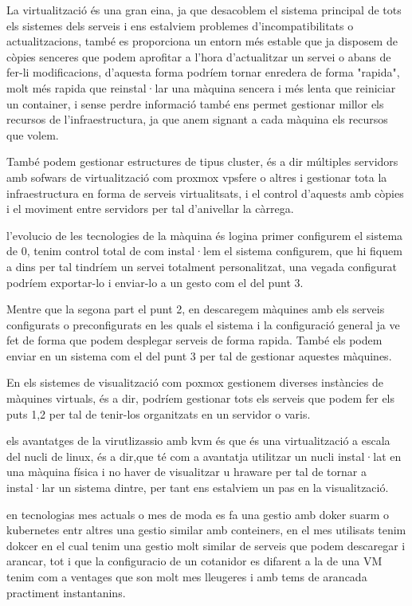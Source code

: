 \documentclass[preprint,11pt]{elsarticle}
\begin{document}
La virtualització és una gran eina, ja que desacoblem el sistema principal de tots els sistemes dels serveis i ens estalviem problemes d'incompatibilitats o actualitzacions, també es proporciona un entorn més estable que ja disposem de còpies senceres que podem aprofitar a l'hora d'actualitzar un servei o abans de fer-li modificacions, d'aquesta forma podríem tornar enredera de forma "rapida", molt més rapida que reinstal·lar una màquina sencera i més lenta que reiniciar un container, i sense perdre informació també ens permet gestionar millor els recursos de l'infraestructura, ja que anem signant a cada màquina els recursos que volem.\smallskip

També podem gestionar estructures de tipus cluster, és a dir múltiples servidors amb sofwars de virtualització com proxmox vpsfere o altres i gestionar tota la infraestructura en forma de serveis virtualitsats, i el control d'aquests amb còpies i el moviment entre servidors per tal d'anivellar la càrrega.\smallskip

l'evolucio de les tecnologies de la màquina és logina primer configurem el sistema de 0, tenim control total de com instal·lem el sistema configurem, que hi fiquem a dins per tal tindríem un servei totalment personalitzat, una vegada configurat podríem exportar-lo i enviar-lo a un gesto com el del punt 3.\smallskip

Mentre que la segona part el punt 2, en descaregem màquines amb els serveis configurats o preconfigurats en les quals el sistema i la configuració general ja ve fet de forma que podem desplegar serveis de forma rapida. També els podem enviar en un sistema com el del punt 3 per tal de gestionar aquestes màquines.\smallskip

En els sistemes de visualització com poxmox gestionem diverses instàncies de màquines virtuals, és a dir, podríem gestionar tots els serveis que podem fer els puts 1,2 per tal de tenir-los organitzats en un servidor o varis.\smallskip

els avantatges de la virutlizassio amb kvm és que és una virtualització a escala del nucli de linux, és a dir,que té com a avantatja utilitzar un nucli instal·lat en una màquina física i no haver de visualitzar u hraware per tal de tornar a instal·lar un sistema dintre, per tant ens estalviem un pas en la visualització. \smallskip

en tecnologias mes actuals o mes de moda es fa una gestio amb doker suarm o kubernetes entr altres una gestio similar amb conteiners, en el mes utilisats tenim dokcer en el cual tenim una gestio molt similar de serveis que podem descaregar i arancar, tot i que la configuracio de un cotanidor es difarent a la de una VM tenim com a ventages que son molt mes lleugeres i amb tems de arancada practiment instantanins.\smallskip
\end{document}
